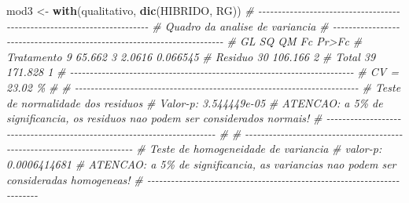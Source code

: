 \documentclass[
]{book}
\newenvironment{Shaded}{\begin{snugshade}}{\end{snugshade}}
\newcommand{\CommentTok}[1]{\textcolor[rgb]{0.56,0.35,0.01}{\textit{#1}}}
\newcommand{\KeywordTok}[1]{\textcolor[rgb]{0.13,0.29,0.53}{\textbf{#1}}}
\newcommand{\NormalTok}[1]{#1}
\newcommand{\StringTok}[1]{\textcolor[rgb]{0.31,0.60,0.02}{#1}}
\numberwithin{equation}{section}
\begin{document}
\begin{Shaded}
\begin{Highlighting}[]

\NormalTok{mod3 \textless{}{-}}\StringTok{ }\KeywordTok{with}\NormalTok{(qualitativo, }\KeywordTok{dic}\NormalTok{(HIBRIDO, RG))}
\CommentTok{\# {-}{-}{-}{-}{-}{-}{-}{-}{-}{-}{-}{-}{-}{-}{-}{-}{-}{-}{-}{-}{-}{-}{-}{-}{-}{-}{-}{-}{-}{-}{-}{-}{-}{-}{-}{-}{-}{-}{-}{-}{-}{-}{-}{-}{-}{-}{-}{-}{-}{-}{-}{-}{-}{-}{-}{-}{-}{-}{-}{-}{-}{-}{-}{-}{-}{-}{-}{-}{-}{-}{-}{-}}
\CommentTok{\# Quadro da analise de variancia}
\CommentTok{\# {-}{-}{-}{-}{-}{-}{-}{-}{-}{-}{-}{-}{-}{-}{-}{-}{-}{-}{-}{-}{-}{-}{-}{-}{-}{-}{-}{-}{-}{-}{-}{-}{-}{-}{-}{-}{-}{-}{-}{-}{-}{-}{-}{-}{-}{-}{-}{-}{-}{-}{-}{-}{-}{-}{-}{-}{-}{-}{-}{-}{-}{-}{-}{-}{-}{-}{-}{-}{-}{-}{-}{-}}
\CommentTok{\#            GL      SQ QM     Fc    Pr\textgreater{}Fc}
\CommentTok{\# Tratamento  9  65.662  3 2.0616 0.066545}
\CommentTok{\# Residuo    30 106.166  2                }
\CommentTok{\# Total      39 171.828  1                }
\CommentTok{\# {-}{-}{-}{-}{-}{-}{-}{-}{-}{-}{-}{-}{-}{-}{-}{-}{-}{-}{-}{-}{-}{-}{-}{-}{-}{-}{-}{-}{-}{-}{-}{-}{-}{-}{-}{-}{-}{-}{-}{-}{-}{-}{-}{-}{-}{-}{-}{-}{-}{-}{-}{-}{-}{-}{-}{-}{-}{-}{-}{-}{-}{-}{-}{-}{-}{-}{-}{-}{-}{-}{-}{-}}
\CommentTok{\# CV = 23.02 \%}
\CommentTok{\# }
\CommentTok{\# {-}{-}{-}{-}{-}{-}{-}{-}{-}{-}{-}{-}{-}{-}{-}{-}{-}{-}{-}{-}{-}{-}{-}{-}{-}{-}{-}{-}{-}{-}{-}{-}{-}{-}{-}{-}{-}{-}{-}{-}{-}{-}{-}{-}{-}{-}{-}{-}{-}{-}{-}{-}{-}{-}{-}{-}{-}{-}{-}{-}{-}{-}{-}{-}{-}{-}{-}{-}{-}{-}{-}{-}}
\CommentTok{\# Teste de normalidade dos residuos }
\CommentTok{\# Valor{-}p:  3.544449e{-}05 }
\CommentTok{\# ATENCAO: a 5\% de significancia, os residuos nao podem ser considerados normais!}
\CommentTok{\# {-}{-}{-}{-}{-}{-}{-}{-}{-}{-}{-}{-}{-}{-}{-}{-}{-}{-}{-}{-}{-}{-}{-}{-}{-}{-}{-}{-}{-}{-}{-}{-}{-}{-}{-}{-}{-}{-}{-}{-}{-}{-}{-}{-}{-}{-}{-}{-}{-}{-}{-}{-}{-}{-}{-}{-}{-}{-}{-}{-}{-}{-}{-}{-}{-}{-}{-}{-}{-}{-}{-}{-}}
\CommentTok{\# }
\CommentTok{\# {-}{-}{-}{-}{-}{-}{-}{-}{-}{-}{-}{-}{-}{-}{-}{-}{-}{-}{-}{-}{-}{-}{-}{-}{-}{-}{-}{-}{-}{-}{-}{-}{-}{-}{-}{-}{-}{-}{-}{-}{-}{-}{-}{-}{-}{-}{-}{-}{-}{-}{-}{-}{-}{-}{-}{-}{-}{-}{-}{-}{-}{-}{-}{-}{-}{-}{-}{-}{-}{-}{-}{-}}
\CommentTok{\# Teste de homogeneidade de variancia }
\CommentTok{\# valor{-}p:  0.0006414681 }
\CommentTok{\# ATENCAO: a 5\% de significancia, as variancias nao podem ser consideradas homogeneas!}
\CommentTok{\# {-}{-}{-}{-}{-}{-}{-}{-}{-}{-}{-}{-}{-}{-}{-}{-}{-}{-}{-}{-}{-}{-}{-}{-}{-}{-}{-}{-}{-}{-}{-}{-}{-}{-}{-}{-}{-}{-}{-}{-}{-}{-}{-}{-}{-}{-}{-}{-}{-}{-}{-}{-}{-}{-}{-}{-}{-}{-}{-}{-}{-}{-}{-}{-}{-}{-}{-}{-}{-}{-}{-}{-}}

\end{Highlighting}
\end{Shaded}
\end{document}
